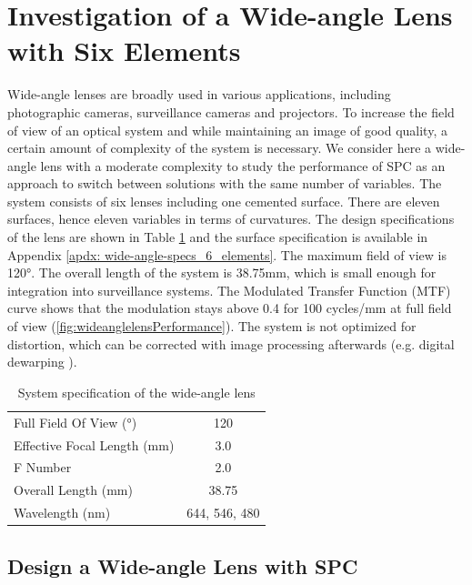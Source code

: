 \section{Investigation of a Wide-angle Lens with Six Elements}
Wide-angle lenses are broadly used in various applications, including photographic cameras, surveillance cameras and projectors. To increase the field of view of an optical system and while maintaining an image of good quality, a certain amount of complexity of the system is necessary. We consider here a wide-angle lens with a moderate complexity to study the performance of SPC as an approach to switch between solutions with the same number of variables. The system consists of six lenses including one cemented surface. There are eleven surfaces, hence eleven variables in terms of curvatures. The design specifications of the lens are shown in Table \ref{table: sysspecWAL} and the surface specification is available in Appendix \ref{apdx: wide-angle-specs_6_elements}. The maximum field of view is 120°. The overall length of the system is 38.75mm, which is small enough for integration into surveillance systems. The Modulated Transfer Function (MTF) curve shows that the modulation stays above 0.4 for 100 cycles/mm at full field of view (\ref{fig:wideanglelensPerformance}). The system is not optimized for distortion, which can be corrected with image processing afterwards (e.g. digital dewarping \cite{Sahin:18DisCorrec}).



\setlength{\arrayrulewidth}{.5mm}
\setlength{\tabcolsep}{18pt}
\renewcommand{\arraystretch}{1.2}
\begin{table}[h!]
    \centering
    \captionsetup{justification=centering}
    \caption{System specification of the wide-angle lens}
    \label{table: sysspecWAL}
    \vspace{-1em}
    \begin{tabular}{ p{20em} c }
    \hline 
    Full Field Of View (°) & 120\\
    Effective Focal Length (mm) & 3.0\\
    F Number & 2.0\\
    Overall Length (mm) & 38.75\\
    Wavelength (nm) & 644, 546, 480\\ %
    \hline
    \end{tabular}
\end{table}

\subsection{Design a Wide-angle Lens with SPC}


